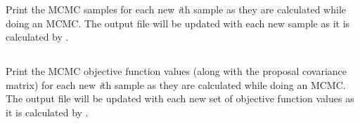 Print the MCMC samples for each new \textit{i}th sample as they are calculated while doing an MCMC. The output file will be updated with each new sample as it is calculated by \SPM.

\subsection{}

Print the MCMC objective function values (along with the proposal covariance matrix) for each new \textit{i}th sample as they are calculated while doing an MCMC. The output file will be updated with each new set of objective function values as it is calculated by \SPM.
